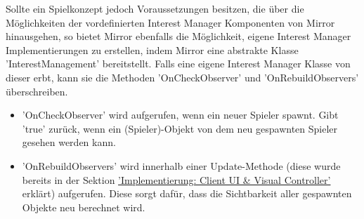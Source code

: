 Sollte ein Spielkonzept jedoch Voraussetzungen besitzen, die über die Möglichkeiten der vordefinierten Interest Manager Komponenten von Mirror hinausgehen, so bietet Mirror ebenfalls die Möglichkeit, eigene Interest Manager Implementierungen zu erstellen, indem Mirror eine abstrakte Klasse 'InterestManagement' bereitstellt. Falls eine eigene Interest Manager Klasse von dieser erbt, kann sie die Methoden 'OnCheckObserver' und 'OnRebuildObservers' überschreiben\cite{.17.02.2022c}. 

\begin{itemize}
	\item 'OnCheckObserver' wird aufgerufen, wenn ein neuer Spieler spawnt. Gibt 'true' zurück, wenn ein (Spieler)-Objekt von dem neu gespawnten Spieler gesehen werden kann.
	\item 'OnRebuildObservers' wird innerhalb einer Update-Methode (diese wurde bereits in der Sektion \hyperref[implementierung:client_UI_Controller]{'Implementierung: Client UI \& Visual Controller'} erklärt) aufgerufen. Diese sorgt dafür, dass die Sichtbarkeit aller gespawnten Objekte neu berechnet wird.
\end{itemize}